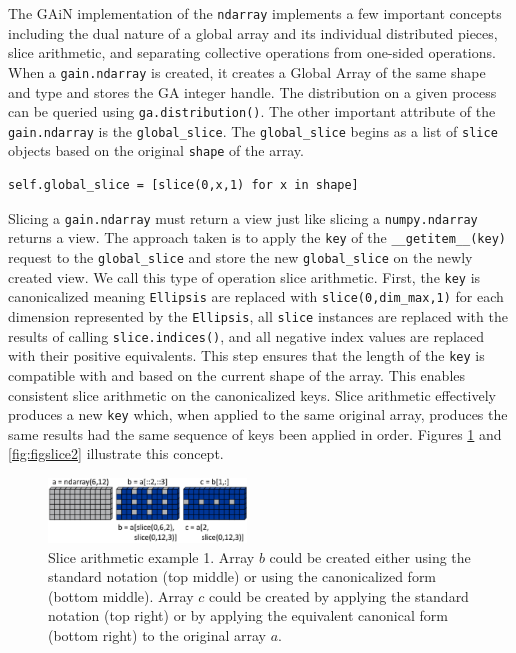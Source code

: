 \documentclass{sigplanconf}
\begin{document}
The GAiN implementation of the \verb=ndarray= implements a few important
concepts including the dual nature of a global array and its individual
distributed pieces, slice arithmetic, and separating collective operations
from one-sided operations. When a \verb=gain.ndarray= is created, it creates a
Global Array of the same shape and type and stores the GA integer handle. The
distribution on a given process can be queried using \verb=ga.distribution()=.
The other important attribute of the \verb=gain.ndarray= is the
\verb=global_slice=.  The \verb=global_slice= begins as a list of \verb=slice=
objects based on the original \verb=shape= of the array.

\begin{verbatim}
self.global_slice = [slice(0,x,1) for x in shape]
\end{verbatim}

Slicing a \verb=gain.ndarray= must return a view just like slicing a
\verb=numpy.ndarray= returns a view. The approach taken is to apply the
\verb=key= of the \verb=__getitem__(key)= request to the \verb=global_slice=
and store the new \verb=global_slice= on the newly created view. We call this
type of operation slice arithmetic. First, the \verb=key= is canonicalized
meaning \verb=Ellipsis= are replaced with \verb=slice(0,dim_max,1)= for each
dimension represented by the \verb=Ellipsis=, all \verb=slice= instances are
replaced with the results of calling \verb=slice.indices()=, and all negative
index values are replaced with their positive equivalents. This step ensures
that the length of the \verb=key= is compatible with and based on the current
shape of the array.  This enables consistent slice arithmetic on the
canonicalized keys. Slice arithmetic effectively produces a new \verb=key=
which, when applied to the same original array, produces the same results had
the same sequence of keys been applied in order. Figures \ref{fig:slice1}
and \ref{fig:figslice2} illustrate this concept.

\begin{figure}[htb]
\centering
\includegraphics[width=0.47\textwidth]{image4a_crop.eps}
\caption{
Slice arithmetic example 1. Array $b$ could be created either using the
standard notation (top middle) or using the canonicalized form (bottom
middle). Array $c$ could be created by applying the standard notation (top
right) or by applying the equivalent canonical form (bottom right) to the
original array $a$.
}
\label{fig:slice1}
\end{figure}
\end{document}
